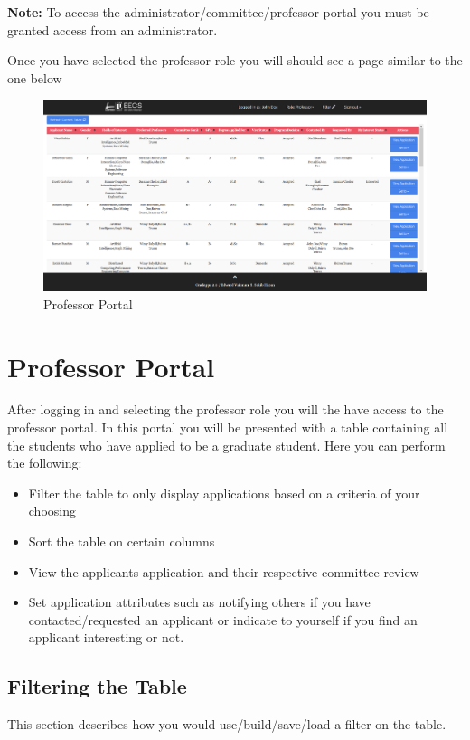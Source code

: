 \documentclass[fontsize=12pt,paper=letter,twoside]{scrartcl}
\begin{document}
\noindent \textbf{Note:} To access the administrator/committee/professor portal you must be granted access from an administrator.

\clearpage

Once you have selected the professor role you will should see a page similar to the one below

\begin{figure}[!htb]
\begin{center}
\includegraphics[width=.99\textwidth]{images/professor.png}
\end{center}
\caption{Professor Portal}
\label{fig:professor}
\end{figure}

\clearpage
\section{Professor Portal}
After logging in and selecting the professor role you will the have access to the professor portal. In this portal you will be presented with a table containing all the students who have applied to be a graduate student. Here you can perform the following:
\begin{itemize}
\item Filter the table to only display applications based on a criteria of your choosing
\item Sort the table on certain columns
\item View the applicants application and their respective committee review
\item Set application attributes such as notifying others if you have contacted/requested an applicant or indicate to yourself if you find an applicant interesting or not.
\end{itemize} 
\subsection{Filtering the Table}
This section describes how you would use/build/save/load a filter on the table.
\end{document}
